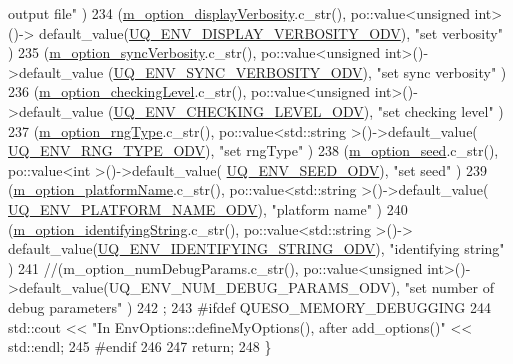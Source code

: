 \begin{DoxyCode}
{       output file"}        )
234     (\hyperlink{class_q_u_e_s_o_1_1_environment_options_a4f89e406c541712444f057a871a9c721}{m\_option\_displayVerbosity}.c\_str(),      po::value<unsigned int>()->
      default\_value(\hyperlink{_environment_options_8h_aa0aed60fbfac9147a8f4d02f5e57fc3c}{UQ\_ENV\_DISPLAY\_VERBOSITY\_ODV}),        \textcolor{stringliteral}{"set verbosity"}                       
                )
235     (\hyperlink{class_q_u_e_s_o_1_1_environment_options_a009eab8a08fe215cd9a6efe81010037d}{m\_option\_syncVerbosity}.c\_str(),         po::value<unsigned int>()->default\_value
      (\hyperlink{_environment_options_8h_a4388bca2484d2787f65db58c924e4663}{UQ\_ENV\_SYNC\_VERBOSITY\_ODV}),           \textcolor{stringliteral}{"set sync verbosity"}                        
          )
236     (\hyperlink{class_q_u_e_s_o_1_1_environment_options_acd9571003814792e4214aab6969cc397}{m\_option\_checkingLevel}.c\_str(),         po::value<unsigned int>()->default\_value
      (\hyperlink{_environment_options_8h_af34c1c6676f7044beafb32dab1a1301a}{UQ\_ENV\_CHECKING\_LEVEL\_ODV}),           \textcolor{stringliteral}{"set checking level"}                        
          )
237     (\hyperlink{class_q_u_e_s_o_1_1_environment_options_afe9a3368caa5bcc6466bb958a43221bc}{m\_option\_rngType}.c\_str(),               po::value<std::string >()->default\_value(
      \hyperlink{_environment_options_8h_a706f5da95b8e726b803ef2b7e3dcb7c9}{UQ\_ENV\_RNG\_TYPE\_ODV}),                 \textcolor{stringliteral}{"set rngType"}                                   )
238     (\hyperlink{class_q_u_e_s_o_1_1_environment_options_af5e8b8eee6336e047956e262a42e9996}{m\_option\_seed}.c\_str(),                  po::value<int         >()->default\_value(
      \hyperlink{_environment_options_8h_a46ccfdca1dd926bb77e0a35061f7b8e2}{UQ\_ENV\_SEED\_ODV}),                     \textcolor{stringliteral}{"set seed"}                                      )
239     (\hyperlink{class_q_u_e_s_o_1_1_environment_options_a7f53c8be62f5b0b32d01f412f6e1f24d}{m\_option\_platformName}.c\_str(),          po::value<std::string >()->default\_value(
      \hyperlink{_environment_options_8h_af3bd1899c8b9dd8693709bfde2380b54}{UQ\_ENV\_PLATFORM\_NAME\_ODV}),            \textcolor{stringliteral}{"platform name"}                              
         )
240     (\hyperlink{class_q_u_e_s_o_1_1_environment_options_a20ec38c1f5b7f1b288c7a0151c646e1b}{m\_option\_identifyingString}.c\_str(),     po::value<std::string >()->
      default\_value(\hyperlink{_environment_options_8h_acd20b252766664d5f0d557b1b99ae9cd}{UQ\_ENV\_IDENTIFYING\_STRING\_ODV}),       \textcolor{stringliteral}{"identifying string"}                
                  )
241   \textcolor{comment}{//(m\_option\_numDebugParams.c\_str(),        po::value<unsigned
       int>()->default\_value(UQ\_ENV\_NUM\_DEBUG\_PARAMS\_ODV),         "set number of debug parameters"                )}
242   ;
243 \textcolor{preprocessor}{#ifdef QUESO\_MEMORY\_DEBUGGING}
244 \textcolor{preprocessor}{}  std::cout << \textcolor{stringliteral}{"In EnvOptions::defineMyOptions(), after add\_options()"} << std::endl;
245 \textcolor{preprocessor}{#endif}
246 \textcolor{preprocessor}{}
247   \textcolor{keywordflow}{return};
248 \}
\end{DoxyCode}
